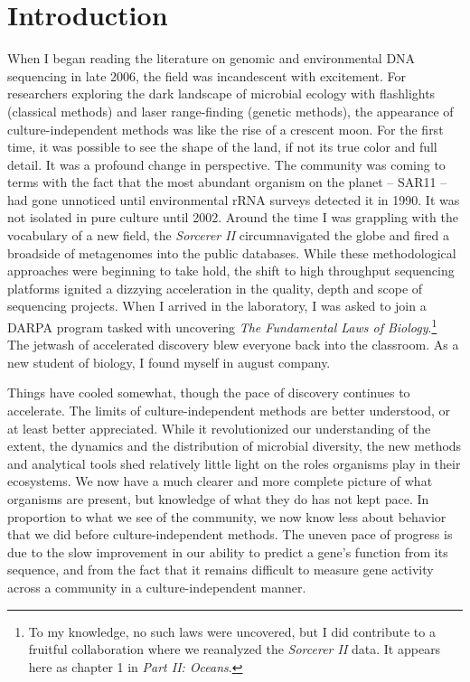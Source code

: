 \section*{Introduction}

When I began reading the literature on genomic and environmental DNA sequencing in late 2006, the field was incandescent with excitement. For researchers exploring the dark landscape of microbial ecology with flashlights (classical methods) and laser range-finding (genetic methods), the appearance of culture-independent methods was like the rise of a crescent moon. For the first time, it was possible to see the shape of the land, if not its true color and full detail. It was a profound change in perspective. The community was coming to terms with the fact that the most abundant organism on the planet -- SAR11 -- had gone unnoticed until environmental rRNA surveys detected it in 1990. It was not isolated in pure culture until 2002. Around the time I was grappling with the vocabulary of a new field, the {\em Sorcerer II} circumnavigated the globe and fired a broadside of metagenomes into the public databases. \cite{yooseph2007sorcerer, rusch2007sorcerer, williamson2008sorcerer} While these methodological approaches were beginning to take hold, the shift to high throughput sequencing platforms ignited a dizzying acceleration in the quality, depth and scope of sequencing projects. When I arrived in the laboratory, I was asked to join a DARPA program tasked with uncovering {\em The Fundamental Laws of Biology}.\footnote{To my knowledge, no such laws were uncovered, but I did contribute to a fruitful collaboration where we reanalyzed the {\em Sorcerer II} data. It appears here as chapter 1 in {\em Part II: Oceans}.} The jetwash of accelerated discovery blew everyone back into the classroom. As a new student of biology, I found myself in august company.

Things have cooled somewhat, though the pace of discovery continues to accelerate. The limits of culture-independent methods are better understood, or at least better appreciated. While it revolutionized our understanding of the extent, the dynamics and the distribution of microbial diversity, the new methods and analytical tools shed relatively little light on the roles organisms play in their ecosystems. We now have a much clearer and more complete picture of what organisms are present, but knowledge of what they do has not kept pace. In proportion to what we see of the community, we now know less about behavior that we did before culture-independent methods. The uneven pace of progress is due to the slow improvement in our ability to predict a gene's function from its sequence, and from the fact that it remains difficult to measure gene activity across a community in a culture-independent manner.

